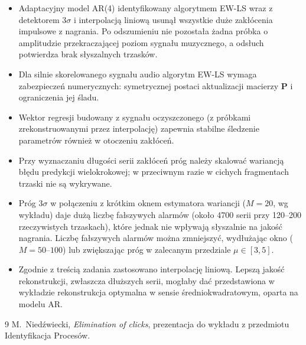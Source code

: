 \documentclass[11pt,a4paper]{article}
\begin{document}
\begin{itemize}
  \item Adaptacyjny model AR(4) identyfikowany algorytmem EW-LS wraz
        z detektorem $3\sigma$ i interpolacją liniową usunął wszystkie duże
        zakłócenia impulsowe z nagrania. Po odszumieniu nie pozostała żadna
        próbka o amplitudzie przekraczającej poziom sygnału muzycznego,
        a odsłuch potwierdza brak słyszalnych trzasków.
  \item Dla silnie skorelowanego sygnału audio algorytm EW-LS wymaga
        zabezpieczeń numerycznych: symetrycznej postaci aktualizacji
        macierzy $\mathbf{P}$ i ograniczenia jej śladu.
  \item Wektor regresji budowany z sygnału oczyszczonego (z próbkami
        zrekonstruowanymi przez interpolację) zapewnia stabilne śledzenie
        parametrów również w otoczeniu zakłóceń.
  \item Przy wyznaczaniu długości serii zakłóceń próg należy skalować
        wariancją błędu predykcji wielokrokowej; w przeciwnym razie
        w cichych fragmentach trzaski nie są wykrywane.
  \item Próg $3\sigma$ w połączeniu z krótkim oknem estymatora wariancji
        ($M = 20$, wg wykładu) daje dużą liczbę fałszywych alarmów (około
        4700 serii przy 120--200 rzeczywistych trzaskach), które jednak
        nie wpływają słyszalnie na jakość nagrania. Liczbę fałszywych
        alarmów można zmniejszyć, wydłużając okno ($M = 50$--$100$) lub
        zwiększając próg w zalecanym przedziale $\mu \in [3, 5]$.
  \item Zgodnie z treścią zadania zastosowano interpolację liniową. Lepszą
        jakość rekonstrukcji, zwłaszcza dłuższych serii, mogłaby dać
        przedstawiona w wykładzie rekonstrukcja optymalna w sensie
        średniokwadratowym, oparta na modelu AR.
\end{itemize}

\begin{thebibliography}{9}
   M.~Niedźwiecki, \emph{Elimination of clicks},
    prezentacja do wykładu z przedmiotu Identyfikacja Procesów.
\end{thebibliography}
\end{document}
